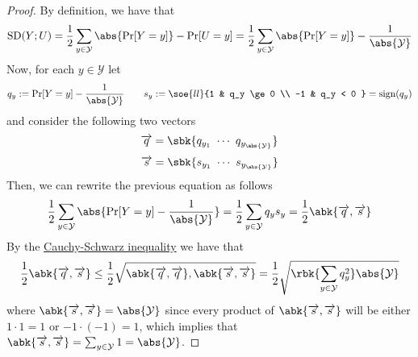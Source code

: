\documentclass[a4paper, 12pt]{report}
\begin{document}
\begin{proof}
	By definition, we have that $$\mbox{SD}(Y;U) = \dfrac{1}{2}\sum_{y \in \mathcal Y}{\abs{\Pr[Y = y]} - \Pr[U = y]} = \dfrac{1}{2} \sum_{y \in \mathcal Y}{\abs{\Pr[Y = y]} - \dfrac{1}{\abs{\mathcal Y}}}$$ Now, for each $y \in \mathcal Y$ let $$q_y := \Pr[Y = y]- \dfrac{1}{\abs{\mathcal Y}} \quad \quad s_y := \soe{ll}{1 & q_y \ge 0 \\ -1 & q_y < 0 }= \mbox{sign}(q_y)$$ and consider the following two vectors $$\overrightarrow{q} = \sbk{q_{y_1} \ \cdots \ q_{y_{\abs{\mathcal Y}}}}$$ $$\overrightarrow{s} = \sbk{s_{y_1} \ \cdots \ s_{y_{\abs{\mathcal Y}}}}$$ Then, we can rewrite the previous equation as follows $$\dfrac{1}{2}\sum_{y \in \mathcal Y}{\abs{\Pr[Y = y] - \dfrac{1}{\abs{\mathcal Y}}}} = \dfrac{1}{2} \sum_{y \in \mathcal Y}{q_y s_y} = \dfrac{1}{2}{\abk{\overrightarrow q, \overrightarrow s}}$$ By the \href{https://en.wikipedia.org/wiki/Cauchy%E2%80%93Schwarz_inequality}{Cauchy-Schwarz inequality} we have that $$\dfrac{1}{2}{\abk{\overrightarrow q, \overrightarrow s}} \le  \dfrac{1}{2} \sqrt{\abk{\overrightarrow q, \overrightarrow q}, \abk{\overrightarrow s, \overrightarrow s}} = \dfrac{1}{2} \sqrt{\rbk{\sum_{y \in \mathcal Y}{q_y^2}} \abs{\mathcal Y}}$$ where $\abk{\overrightarrow s, \overrightarrow s} = \abs{\mathcal Y}$ since every product of $\abk{\overrightarrow s, \overrightarrow s}$ will be either $1 \cdot 1 = 1$ or $-1 \cdot (-1) = 1$, which implies that $\abk{\overrightarrow s, \overrightarrow s} = \sum_{y \in \mathcal{Y}} {1} = \abs{\mathcal Y}$.


\end{proof}
\end{document}
